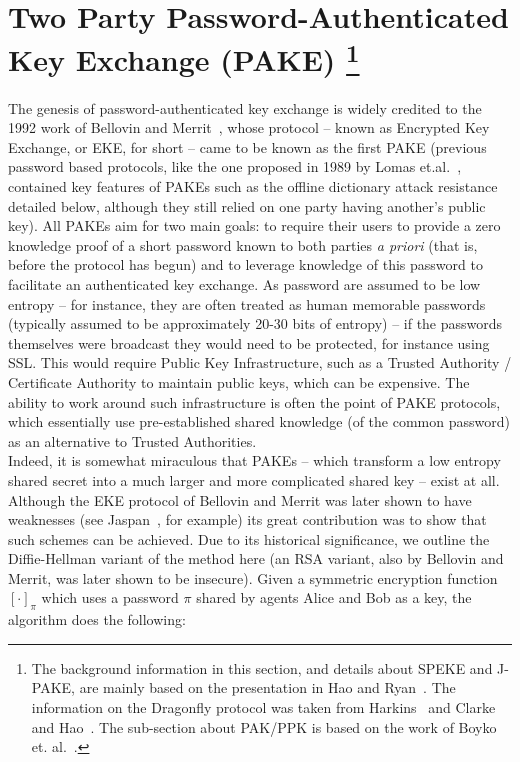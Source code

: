 \documentclass{amsart}
\theoremstyle{remark}
\begin{document}

\section{Two Party Password-Authenticated Key Exchange (PAKE)
{\protect\footnote{The background information in this section, and details about SPEKE and J-PAKE, are mainly based on the presentation 
 in Hao and Ryan~\cite{HaRy2010}. The information on the Dragonfly protocol was taken from Harkins~\cite{Ha15} and Clarke and Hao~\cite{Ha2014}.  
 The sub-section about PAK/PPK is based on the work of Boyko et. al.~\cite{BoMaPa00}.}}}
\label{sec:PAKE}
 
 The genesis of password-authenticated key exchange is widely credited to the 1992 work of Bellovin and 
 Merrit~\cite{BeMe92}, whose protocol -- known as Encrypted Key Exchange, or EKE, for short -- came to 
 be known as the first PAKE (previous password based protocols, like the one proposed in 1989 by Lomas et.al.~\cite{LoGoSaNe89}, 
 contained key features of PAKEs such as the offline dictionary attack resistance detailed below, although they still relied on
 one party having another's public key).  All PAKEs aim for two main goals: to require their users to provide a zero 
 knowledge proof of a short password known to both parties \emph{a priori} (that is, before the protocol 
 has begun) and to leverage knowledge of this password to facilitate an authenticated key exchange.  As 
 password are assumed to be low entropy -- for instance, they are often treated as human memorable 
 passwords (typically assumed to be approximately 20-30 bits of entropy) -- if the passwords 
 themselves were broadcast they would need to be protected, for instance using SSL.  This would require Public 
 Key Infrastructure, such as a Trusted Authority / Certificate Authority to maintain public keys, which can be expensive.
 The ability to work around such infrastructure is often the point of PAKE protocols, which essentially use
 pre-established shared knowledge (of the common password) as an alternative to Trusted Authorities.
 \\

 Indeed, it is somewhat miraculous that PAKEs -- which transform a low entropy shared secret into a 
 much larger and more complicated shared key -- exist at all.  Although the EKE protocol of Bellovin and 
 Merrit was later shown to have weaknesses (see Jaspan~\cite{Ja96}, for example) its great contribution was 
 to show that such schemes can be achieved.  Due to its historical significance, we outline the Diffie-Hellman
 variant of the method here (an RSA variant, also by Bellovin and Merrit, was later shown to be insecure).  
 Given a symmetric encryption function $[\cdot]_\pi$ which uses a password $\pi$ shared
 by agents Alice and Bob as a key, the algorithm does the following:
 \\
\end{document}

